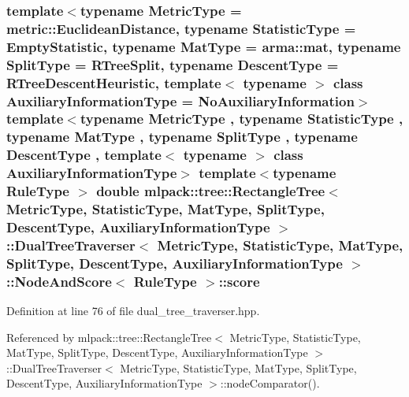 \subsubsection[{score}]{\setlength{\rightskip}{0pt plus 5cm}template$<$typename Metric\+Type  = metric\+::\+Euclidean\+Distance, typename Statistic\+Type  = Empty\+Statistic, typename Mat\+Type  = arma\+::mat, typename Split\+Type  = R\+Tree\+Split, typename Descent\+Type  = R\+Tree\+Descent\+Heuristic, template$<$ typename $>$ class Auxiliary\+Information\+Type = No\+Auxiliary\+Information$>$ template$<$typename Metric\+Type , typename Statistic\+Type , typename Mat\+Type , typename Split\+Type , typename Descent\+Type , template$<$ typename $>$ class Auxiliary\+Information\+Type$>$ template$<$typename Rule\+Type $>$ double {\bf mlpack\+::tree\+::\+Rectangle\+Tree}$<$ Metric\+Type, Statistic\+Type, Mat\+Type, {\bf Split\+Type}, {\bf Descent\+Type}, Auxiliary\+Information\+Type $>$\+::{\bf Dual\+Tree\+Traverser}$<$ Metric\+Type, Statistic\+Type, Mat\+Type, {\bf Split\+Type}, {\bf Descent\+Type}, Auxiliary\+Information\+Type $>$\+::{\bf Node\+And\+Score}$<$ Rule\+Type $>$\+::score}\label{structmlpack_1_1tree_1_1RectangleTree_1_1DualTreeTraverser_1_1NodeAndScore_a80504d2ca447f3f0ba402a9d94404135}


Definition at line 76 of file dual\+\_\+tree\+\_\+traverser.\+hpp.



Referenced by mlpack\+::tree\+::\+Rectangle\+Tree$<$ Metric\+Type, Statistic\+Type, Mat\+Type, Split\+Type, Descent\+Type, Auxiliary\+Information\+Type $>$\+::\+Dual\+Tree\+Traverser$<$ Metric\+Type, Statistic\+Type, Mat\+Type, Split\+Type, Descent\+Type, Auxiliary\+Information\+Type $>$\+::node\+Comparator().

